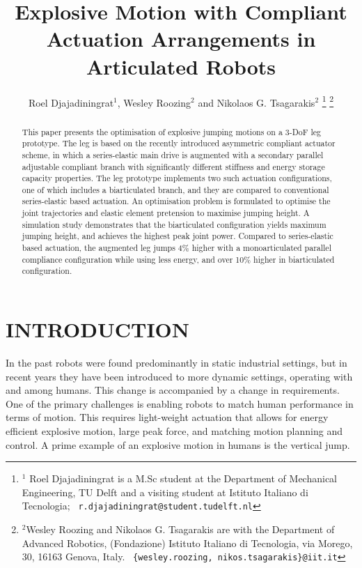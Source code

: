 \documentclass[letterpaper, 10 pt, conference]{ieeeconf}  %
\title{\LARGE \bf
	Explosive Motion with Compliant Actuation Arrangements in Articulated Robots
}
\author{Roel Djajadiningrat$^{1}$, Wesley Roozing$^{2}$ and Nikolaos G. Tsagarakis$^{2}$%
	\thanks{$^{1}$ Roel Djajadiningrat is a M.Sc student at the Department of Mechanical Engineering, TU Delft and a visiting student at Istituto Italiano di Tecnologia;
		{\tt\ r.djajadiningrat@student.tudelft.nl}
	}%
	\thanks{$^{2}$Wesley Roozing and Nikolaos G. Tsagarakis are with the Department of Advanced Robotics,
		(Fondazione) Istituto Italiano di Tecnologia, via Morego,
		30, 16163 Genova, Italy.
		{\tt\ \{wesley.roozing, nikos.tsagarakis\}@iit.it}
	}%
}
\begin{document}
\maketitle
\thispagestyle{empty}
\pagestyle{empty}


\begin{abstract}

This paper presents the optimisation of explosive jumping motions on a 3-DoF leg prototype. The leg is based on the recently introduced asymmetric compliant actuator scheme, in which a series-elastic main drive is augmented with a secondary parallel adjustable compliant branch with significantly different stiffness and energy storage capacity properties. The leg prototype implements two such actuation configurations, one of which includes a biarticulated branch, and they are compared to conventional series-elastic based actuation. An optimisation problem is formulated to optimise the joint trajectories and elastic element pretension to maximise jumping height. A simulation study demonstrates that the biarticulated configuration yields maximum jumping height, and achieves the highest peak joint power. Compared to series-elastic based actuation, the augmented leg jumps 4\% higher with a monoarticulated parallel compliance configuration while using less energy, and over 10\% higher in biarticulated configuration.

\end{abstract}


\section{INTRODUCTION}
In the past robots were found predominantly in static industrial settings, but in recent years they have been introduced to more dynamic settings, operating with and among humans. This change is accompanied by a change in requirements. One of the primary challenges is enabling robots to match human performance in terms of motion. This requires light-weight actuation that allows for energy efficient explosive motion, large peak force, and matching motion planning and control. A prime example of an explosive motion in humans is the vertical jump.
\end{document}
